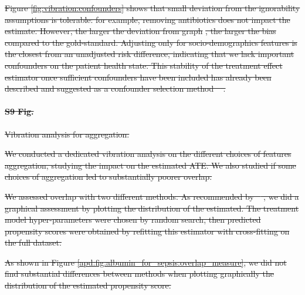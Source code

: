 \documentclass[10pt,letterpaper]{article}
\providecommand{\DIFaddtex}[1]{{\protect\color{blue}\uwave{#1}}} %
\providecommand{\DIFdeltex}[1]{{\protect\color{red}\sout{#1}}}                      %
\providecommand{\DIFaddbegin}{} %
\providecommand{\DIFaddend}{} %
\providecommand{\DIFdelbegin}{} %
\providecommand{\DIFdelend}{} %
\providecommand{\DIFadd}[1]{\texorpdfstring{\DIFaddtex{#1}}{#1}} %
\providecommand{\DIFdel}[1]{\texorpdfstring{\DIFdeltex{#1}}{}} %
\newcommand{\DIFscaledelfig}{0.5}
\newlength{\DIFdelgraphicswidth} %
\newlength{\DIFdelgraphicsheight} %
\newcommand{\DIFaddincludegraphics}[2][]{{\color{blue}\fbox{\DIFOincludegraphics[#1]{#2}}}} %
\newcommand{\DIFdelincludegraphics}[2][]{%
\sbox{\DIFdelgraphicsbox}{\DIFOincludegraphics[#1]{#2}}%
\settoboxwidth{\DIFdelgraphicswidth}{\DIFdelgraphicsbox} %
\settoboxtotalheight{\DIFdelgraphicsheight}{\DIFdelgraphicsbox} %
\scalebox{\DIFscaledelfig}{%
\parbox[b]{\DIFdelgraphicswidth}{\usebox{\DIFdelgraphicsbox}\\[-\baselineskip] \rule{\DIFdelgraphicswidth}{0em}}\llap{\resizebox{\DIFdelgraphicswidth}{\DIFdelgraphicsheight}{%
\setlength{\unitlength}{\DIFdelgraphicswidth}%
\begin{picture}(1,1)%
\thicklines\linethickness{2pt} %
{\color[rgb]{1,0,0}\put(0,0){\framebox(1,1){}}}%
{\color[rgb]{1,0,0}\put(0,0){\line( 1,1){1}}}%
{\color[rgb]{1,0,0}\put(0,1){\line(1,-1){1}}}%
\end{picture}%
}\hspace*{3pt}}} %
} %
\DeclareRobustCommand{\DIFaddbegin}{\DIFOaddbegin \let\includegraphics\DIFaddincludegraphics} %
\DeclareRobustCommand{\DIFaddend}{\DIFOaddend \let\includegraphics\DIFOincludegraphics} %
\DeclareRobustCommand{\DIFdelbegin}{\DIFOdelbegin \let\includegraphics\DIFdelincludegraphics} %
\DeclareRobustCommand{\DIFdelend}{\DIFOaddend \let\includegraphics\DIFOincludegraphics} %
\begin{document}
\DIFdel{Figure \ref{fig:vibration:confounders} shows that small
  deviation from the ignorability assumptions is tolerable: for example, removing
  antibiotics does not impact the estimate. However, the larger the
  deviation from graph }%
\DIFdel{, the larger the bias
  compared to the gold-standard. Adjusting only for socio-demographics features
  is the closest from an unadjusted risk difference, indicating that we lack
  important confounders on the patient health state. This stability of the
  treatment effect estimator once sufficient confounders have been included has
  already been described and suggested as a confounder selection method
  \mbox{%
    \cite{loh2021confounder}}\hskip0pt%
  .
}%

\DIFdelend \paragraph*{\DIFdelbegin \DIFdel{S9 Fig.}\DIFdelend \DIFaddbegin \DIFadd{S7 Appendix}\DIFaddend }
\DIFdelbegin %
\DIFdel{Vibration analysis for aggregation.}%

\DIFdel{We conducted a dedicated vibration analysis on the different choices of
  features aggregation, studying the impact on the estimated ATE. We also
  studied if some choices of aggregation led to substantially poorer overlap.
}%

\DIFdel{We assessed overlap with two different methods. As recommended by
  \mbox{%
    \cite{austin2015moving}}\hskip0pt%
  , we did a graphical assessment by plotting the
  distribution of the estimated. The treatment model hyper-parameters were chosen
  by random search, then predicted propensity scores were obtained by refitting
  this estimator with cross-fitting on the full dataset.
}%

\DIFdel{As shown in Figure \ref{apd:fig:albumin_for_sepsis:overlap_measure}, we did not find substantial differences between methods
  when plotting graphically the distribution of the estimated propensity score.
}%
\end{document}
